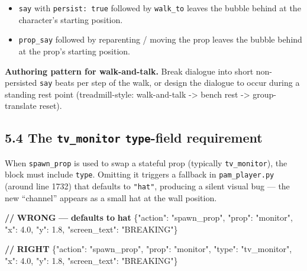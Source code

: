 \documentclass[
  12pt,
  letterpaper,
]{book}
\newenvironment{Shaded}{}{}
\newcommand{\DataTypeTok}[1]{\textcolor[rgb]{0.56,0.13,0.00}{#1}}
\newcommand{\ErrorTok}[1]{\textcolor[rgb]{1.00,0.00,0.00}{\textbf{#1}}}
\newcommand{\FloatTok}[1]{\textcolor[rgb]{0.25,0.63,0.44}{#1}}
\newcommand{\FunctionTok}[1]{\textcolor[rgb]{0.02,0.16,0.49}{#1}}
\newcommand{\StringTok}[1]{\textcolor[rgb]{0.25,0.44,0.63}{#1}}
\providecommand{\tightlist}{%
  \setlength{\itemsep}{0pt}\setlength{\parskip}{0pt}}
\begin{document}
\begin{itemize}
\tightlist
\item
  \texttt{say} with \texttt{persist:\ true} followed by
  \texttt{walk\_to} leaves the bubble behind at the character's starting
  position.
\item
  \texttt{prop\_say} followed by reparenting / moving the prop leaves
  the bubble behind at the prop's starting position.
\end{itemize}

\textbf{Authoring pattern for walk-and-talk.} Break dialogue into short
non-persisted \texttt{say} beats per step of the walk, or design the
dialogue to occur during a standing rest point (treadmill-style:
walk-and-talk -\textgreater{} bench rest -\textgreater{} group-translate
reset).

\subsection{\texorpdfstring{5.4 The \texttt{tv\_monitor}
\texttt{type}-field
requirement}{5.4 The tv\_monitor type-field requirement}}\label{the-tv_monitor-type-field-requirement}

When \texttt{spawn\_prop} is used to swap a stateful prop (typically
\texttt{tv\_monitor}), the block must include \texttt{type}. Omitting it
triggers a fallback in \texttt{pam\_player.py} (around line 1732) that
defaults to \texttt{"hat"}, producing a silent visual bug --- the new
``channel'' appears as a small hat at the wall position.

\begin{Shaded}
\begin{Highlighting}[]
\ErrorTok{//} \ErrorTok{WRONG} \ErrorTok{—} \ErrorTok{defaults} \ErrorTok{to} \ErrorTok{hat}
\FunctionTok{\{}\DataTypeTok{"action"}\FunctionTok{:} \StringTok{"spawn\_prop"}\FunctionTok{,} \DataTypeTok{"prop"}\FunctionTok{:} \StringTok{"monitor"}\FunctionTok{,}
 \DataTypeTok{"x"}\FunctionTok{:} \FloatTok{4.0}\FunctionTok{,} \DataTypeTok{"y"}\FunctionTok{:} \FloatTok{1.8}\FunctionTok{,} \DataTypeTok{"screen\_text"}\FunctionTok{:} \StringTok{"BREAKING"}\FunctionTok{\}}

\ErrorTok{//} \ErrorTok{RIGHT}
\FunctionTok{\{}\DataTypeTok{"action"}\FunctionTok{:} \StringTok{"spawn\_prop"}\FunctionTok{,} \DataTypeTok{"prop"}\FunctionTok{:} \StringTok{"monitor"}\FunctionTok{,}
 \DataTypeTok{"type"}\FunctionTok{:} \StringTok{"tv\_monitor"}\FunctionTok{,}
 \DataTypeTok{"x"}\FunctionTok{:} \FloatTok{4.0}\FunctionTok{,} \DataTypeTok{"y"}\FunctionTok{:} \FloatTok{1.8}\FunctionTok{,} \DataTypeTok{"screen\_text"}\FunctionTok{:} \StringTok{"BREAKING"}\FunctionTok{\}}
\end{Highlighting}
\end{Shaded}
\end{document}
